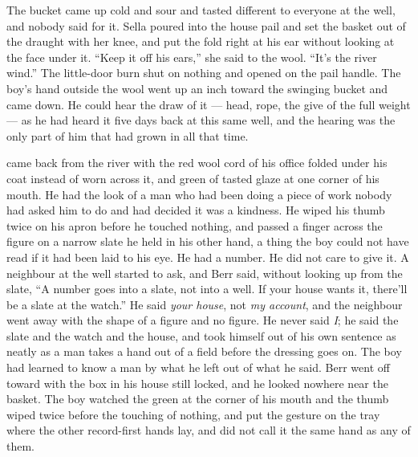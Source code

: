 The bucket came up cold and sour and tasted different to everyone at the well, and nobody said  for it. Sella poured into the house pail and set the basket out of the draught with her knee, and put the fold right at his ear without looking at the face under it. “Keep it off his ears,” she said to the wool. “It's the river wind.” The little-door burn shut on nothing and opened on the pail handle. The boy's hand outside the wool went up an inch toward the swinging bucket and came down. He could hear the draw of it --- head, rope, the give of the full weight --- as he had heard it five days back at this same well, and the hearing was the only part of him that had grown in all that time.

 came back from the river with the red wool cord of his office folded under his coat instead of worn across it, and green of tasted glaze at one corner of his mouth. He had the look of a man who had been doing a piece of work nobody had asked him to do and had decided it was a kindness. He wiped his thumb twice on his apron before he touched nothing, and passed a finger across the figure on a narrow slate he held in his other hand, a thing the boy could not have read if it had been laid to his eye. He had a number. He did not care to give it. A neighbour at the well started to ask, and Berr said, without looking up from the slate, “A number goes into a slate, not into a well. If your house wants it, there'll be a slate at the watch.” He said \emph{your house}, not \emph{my account}, and the neighbour went away with the shape of a figure and no figure. He never said \emph{I}; he said the slate and the watch and the house, and took himself out of his own sentence as neatly as a man takes a hand out of a field before the dressing goes on. The boy had learned to know a man by what he left out of what he said. Berr went off toward  with the box in his house still locked, and he looked nowhere near the basket. The boy watched the green at the corner of his mouth and the thumb wiped twice before the touching of nothing, and put the gesture on the tray where the other record-first hands lay, and did not call it the same hand as any of them.

